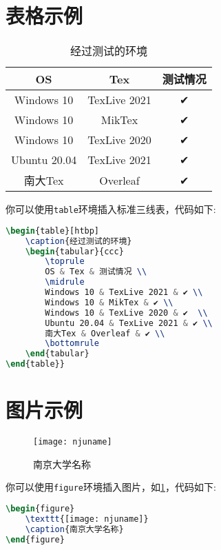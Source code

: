 \documentclass[
    TitleLength=1,%
]{njuthesis}
\begin{document}
\section{表格示例}
\begin{table}[htbp]
    \caption{经过测试的环境}
    \begin{tabular}{ccc}
        \toprule
        OS & Tex & 测试情况 \\
        \midrule
        Windows 10 & TexLive 2021 & ✔ \\
        Windows 10 & MikTex & ✔ \\
        Windows 10 & TexLive 2020 & ✔  \\
        Ubuntu 20.04 & TexLive 2021 & ✔ \\
        南大Tex & Overleaf & ✔ \\
        \bottomrule
    \end{tabular}
\end{table}
你可以使用\lstinline|table|环境插入标准三线表，代码如下:
\begin{lstlisting}[language=TeX]
\begin{table}[htbp]
    \caption{经过测试的环境}
    \begin{tabular}{ccc}
        \toprule
        OS & Tex & 测试情况 \\
        \midrule
        Windows 10 & TexLive 2021 & ✔ \\
        Windows 10 & MikTex & ✔ \\
        Windows 10 & TexLive 2020 & ✔  \\
        Ubuntu 20.04 & TexLive 2021 & ✔ \\
        南大Tex & Overleaf & ✔ \\
        \bottomrule
    \end{tabular}
\end{table}}
\end{lstlisting}

\section{图片示例}
\begin{figure}[htbp]
    \texttt{[image: njuname]}
    \caption{南京大学名称}
    \label{fig:1}
\end{figure}
你可以使用\lstinline|figure|环境插入图片，如\ref{fig:1}，代码如下:
\begin{lstlisting}[language=TeX]
\begin{figure}
    \texttt{[image: njuname]}
    \caption{南京大学名称}
\end{figure}
\end{lstlisting}
\end{document}

